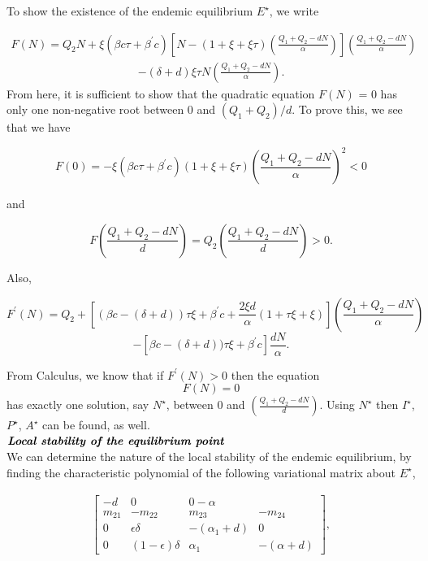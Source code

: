 To show the existence of the endemic equilibrium $E^{\star}$, we write

\begin{align*}
F(N) = Q_{2}N + \xi (\beta c\tau + \beta^{\prime}c) \left[N-(1+\xi+\xi\tau)\left(\frac{Q_{1}+Q_{2}-dN}{\alpha}\right)\right]\left(\frac{Q_{1}+Q_{2}-dN}{\alpha}\right)
\end{align*}
\begin{align*}
- (\delta+d) \xi\tau N \left(\frac{Q_{1}+Q_{2}-dN}{\alpha}\right).
\end{align*}
From here, it is sufficient to show that the quadratic equation $F(N)$ = 0 has only one non-negative root between 0 and $(Q_{1}+Q_{2})/d$. To prove this, we see that we have

$$
F(0)=  - \xi (\beta c\tau + \beta^{\prime}c) (1+\xi+\xi\tau)\left(\frac{Q_{1}+Q_{2}-dN}{\alpha}\right)^{2} < 0
$$

and

$$
F\left(\frac{Q_{1}+Q_{2}-dN}{d}\right) = Q_{2}\left(\frac{Q_{1}+Q_{2}-dN}{d}\right) > 0.
$$

Also,

$$
F^{\prime}(N) = Q_{2} + \left[(\beta c - (\delta + d))\tau\xi + \beta^{\prime}c + \frac{2\xi d}{\alpha} (1+\tau\xi+\xi)\right] \left(\frac{Q_{1}+Q_{2}-dN}{\alpha}\right)$$
$$
- [\beta c - (\delta + d))\tau\xi + \beta^{\prime}c]\frac{dN}{\alpha}.
$$

From Calculus, we know that if $F^{\prime}(N)>0$ then the equation
$$
F(N) = 0
$$
has exactly one solution, say $N^{\star}$, between 0 and $\left(\frac{Q_{1}+Q_{2}-dN}{d}\right)$. Using $N^{\star}$ then $I^{\star}$, $P^{\star}$, $A^{\star}$ can be found, as well.\\

$\textbf{\emph{Local stability of the equilibrium point}}$\\

We can determine the nature of the local stability of the endemic equilibrium, by finding the characteristic polynomial of the following variational matrix about $E^{\star}$,

\begin{align*}
\begin{bmatrix}
-d & 0 & 0 -\alpha \\
m_{21} & -m_{22} & m_{23} & -m_{24} \\
0 & \epsilon\delta & -(\alpha_{1}+d) & 0 \\
0 & (1-\epsilon)\delta & \alpha_{1} & -(\alpha+d)
\end{bmatrix},
\end{align*}

